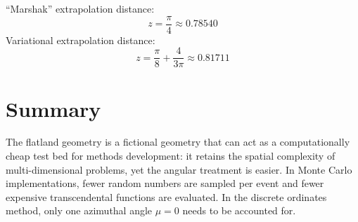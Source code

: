 \clearpage

``Marshak'' extrapolation distance:
\begin{equation*}
  z = \frac{\pi}{4} \approx 0.78540
\end{equation*}
Variational extrapolation distance:
\begin{equation*}
  z = \frac{\pi}{8} + \frac{4}{3\pi} \approx 0.81711
\end{equation*}

\section{Summary}
The flatland geometry is a fictional geometry that can act as a computationally
cheap test bed for methods development: it retains the spatial complexity of
multi-dimensional problems, yet the angular treatment is easier. In Monte Carlo
implementations, fewer random numbers are sampled per event and fewer expensive
transcendental functions are evaluated. In the discrete ordinates method, only
one azimuthal angle $\mu=0$ needs to be accounted for.


